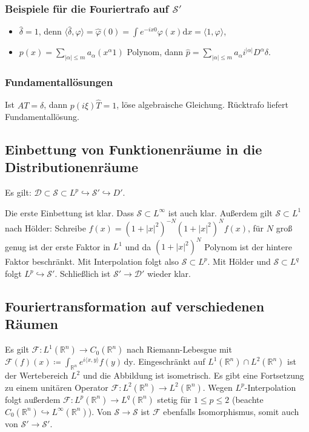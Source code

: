 \documentclass[11pt,a4paper]{scrartcl}
\newcommand{\R}{\mathbb{R}} %
\newcommand{\D}{\mathcal{D}}
\newcommand{\Sc}{\mathcal{S}}
\newcommand{\F}{\mathcal{F}}
\theoremstyle{plain}
\theoremstyle{definition}
\theoremstyle{remark}
\begin{document}
\subsubsection{Beispiele für die Fouriertrafo auf $\Sc'$}

\begin{itemize}
    \item $\hat\delta = 1$, denn $\langle \hat\delta, \varphi \rangle = \hat \varphi(0) = \int e^{-ix0} \varphi(x) \mathrm{d}x = \langle 1, \varphi \rangle$,
    \item $p(x)=\sum_{|\alpha| \leq m} a_\alpha (x^\alpha 1)$ Polynom, dann $\hat p = \sum_{|\alpha| \leq m} a_\alpha i^{|\alpha|} D^\alpha \delta$.
\end{itemize}

\subsubsection{Fundamentallösungen}

Ist $AT=\delta$, dann $p(i\xi)\hat T = 1$, löse algebraische Gleichung. Rücktrafo liefert Fundamentallösung.

\subsection{Einbettung von Funktionenräume in die Distributionenräume}

Es gilt: $\D \subset \Sc \subset L^p \hookrightarrow \Sc' \hookrightarrow D'$.

Die erste Einbettung ist klar. Dass $\Sc \subset L^\infty$ ist auch klar. Außerdem gilt $\Sc \subset L^1$ nach Hölder: Schreibe $f(x)=(1+|x|^2)^{-N}(1+|x|^2)^Nf(x)$, für $N$ groß genug ist der erste Faktor in $L^1$ und da $(1+|x|^2)^N$ Polynom ist der hintere Faktor beschränkt. Mit Interpolation folgt also $\Sc \subset L^p$. Mit Hölder und $\Sc \subset L^q$ folgt $L^p \hookrightarrow \Sc'$. Schließlich ist $\Sc'\to \D'$ wieder klar.

\subsection{Fouriertransformation auf verschiedenen Räumen}

Es gilt $\F: L^1(\R^n) \to C_0(\R^n)$ nach Riemann-Lebesgue mit $\F(f)(x)\coloneqq \int_{\R^n} e^{i\langle x,y \rangle}f(y) \, \mathrm{dy}$. Eingeschränkt auf $L^1(\R^n) \cap L^2(\R^n)$ ist der Wertebereich $L^2$ und die Abbildung ist isometrisch. Es gibt eine Fortsetzung zu einem unitären Operator $\F: L^2(\R^n)\to L^2(\R^n)$. Wegen $L^p$-Interpolation folgt außerdem $\F: L^p(\R^n)\to L^q(\R^n)$ stetig für $1 \leq p \leq 2$ (beachte $C_0(\R^n) \hookrightarrow L^\infty(\R^n)$). Von $\Sc\to \Sc$ ist $\F$ ebenfalls Isomorphismus, somit auch von $\Sc'\to \Sc'$.
\end{document}
